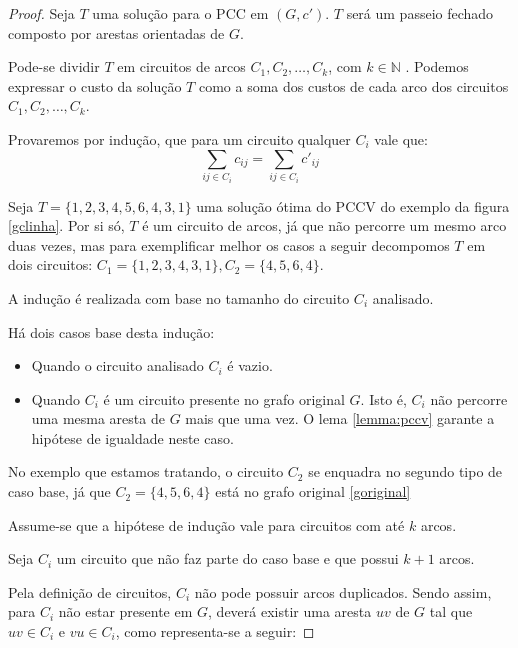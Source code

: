         \begin{proof} 
            Seja $T$ uma solução para o PCC em $(G, c')$. 
            $T$ será um passeio fechado composto por arestas orientadas de $G$.

            Pode-se dividir $T$ em circuitos de arcos $C_1, C_2, \dots, C_k$, com $k \in \mathbb{N}$ . %
            Podemos expressar o custo da solução $T$ como a soma dos custos de cada arco dos circuitos $C_1, C_2, \dots, C_k$. 

            Provaremos por indução, que para um circuito qualquer $C_i$ vale que:
            \[
                \sum_{ij \in C_i} c_{ij} = \sum_{ij \in C_i} c'_{ij}
            \]

            Seja $T = \{1, 2, 3, 4, 5, 6, 4, 3, 1\}$ uma solução ótima do PCCV do exemplo da figura \ref{gclinha}.
            Por si só, $T$ é um circuito de arcos, já que não percorre um mesmo arco duas vezes, mas para exemplificar melhor os casos a seguir decompomos $T$ em dois circuitos: $C_1 = \{1, 2, 3, 4, 3, 1\}, C_2 = \{4, 5, 6, 4\}$.

            A indução é realizada com base no tamanho do circuito $C_i$ analisado.

            Há dois casos base desta indução:

            \begin{itemize}
                \item Quando o circuito analisado $C_i$ é vazio.
                \item Quando $C_i$ é um circuito presente no grafo original $G$. 
                    Isto é, $C_i$ não percorre uma mesma aresta de $G$ mais que uma vez.
                    O lema \ref{lemma:pccv} garante a hipótese de igualdade neste caso.
            \end{itemize}

            No exemplo que estamos tratando, o circuito $C_2$ se enquadra no segundo tipo de caso base, já que $C_2 = \{4, 5, 6, 4\}$ está no grafo original \ref{goriginal}

            Assume-se que a hipótese de indução vale para circuitos com até $k$ arcos.

            Seja $C_i$ um circuito que não faz parte do caso base e que possui $k+1$ arcos.

            Pela definição de circuitos, $C_i$ não pode possuir arcos duplicados.  
            Sendo assim, para $C_i$ não estar presente em $G$, deverá existir uma aresta $uv$ de $G$ tal que $uv \in C_i$ e $vu \in C_i$, como representa-se a seguir:


\end{proof}
